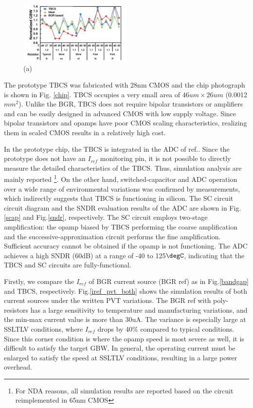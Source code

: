 \documentclass[letterpaper, 10 pt, conference]{ieeeconf}  %
\begin{document}
\begin{figure}[!]
\centering
 \includegraphics[width=0.5\textwidth]{figs/pvt_gbw.png}
  \caption{(a) 
}
\label{iref_gbw}
\end{figure}


The prototype TBCS was fabricated with 28nm CMOS and the chip photograph is shown in Fig. \ref{chip}. TBCS occupies a very small area of $46um \times 26um$ (0.0012$mm^2$). Unlike the BGR, TBCS does not require bipolar transistors or amplifiers and can be easily designed in advanced CMOS with low supply voltage. Since bipolar transistors and opamps have poor CMOS scaling characteristics, realizing them in scaled CMOS results in a relatively high cost.

In the prototype chip, the TBCS is integrated in the ADC of ref.\cite{yoshioka201728}. Since the prototype does not have an $I_{ref}$ monitoring pin, it is not possible to directly measure the detailed characteristics of the TBCS. Thus, simulation analysis are mainly reported \footnote{For NDA reasons, all simulation results are reported based on the circuit reimplemented in 65nm CMOS}. On the other hand, switched-capacitor and ADC operation over a wide range of environmental variations was confirmed by measurements, which indirectly suggests that TBCS is functioning in silicon. The SC circuit circuit diagram and the SNDR evaluation results of the ADC are shown in Fig.\ref{scap} and Fig.\ref{sndr}, respectively. The SC circuit employs two-stage amplification: the opamp biased by TBCS performing the coarse amplification and the successive-approximation circuit performs the fine amplification. Sufficient accuracy cannot be obtained if the opamp is not functioning. The ADC achieves a high SNDR (60dB) at a range of -40 to 125$\degC$, indicating that the TBCS and SC circuits are fully-functional.

Firstly, we compare the $I_{ref}$ of BGR current source (BGR ref) as in Fig.\ref{bandgap} and TBCS, respectively. Fig.\ref{iref_pvt_both} shows the simulation results of both current sources under the written PVT variations. The BGR ref with poly-resistors has a large sensitivity to temperature and manufacturing variations, and the min-max current value is more than 30uA. The variance is especially large at SSLTLV conditions, where $I_{ref}$ drops by 40\% compared to typical conditions.
Since this corner condition is where the opamp speed is most severe as well, it is difficult to satisfy the target GBW. In general, the operating current must be enlarged to satisfy the speed at SSLTLV conditions, resulting in a large power overhead.
\end{document}
